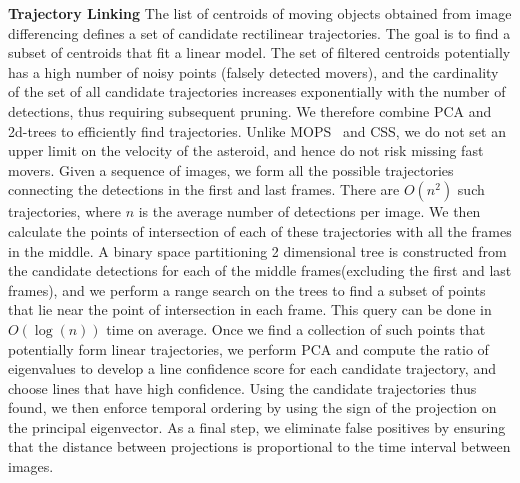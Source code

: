 \documentclass{article}
\begin{document}
{\bf Trajectory Linking}
The list of centroids of moving objects obtained from image differencing defines a set of candidate rectilinear trajectories.  The goal is to find a subset of centroids that fit a linear model.  The set of filtered centroids potentially has a high number of noisy points (falsely detected movers), and the cardinality of the set of all candidate trajectories increases exponentially with the number of detections, thus requiring subsequent pruning. We therefore combine PCA and 2d-trees to efficiently find trajectories. Unlike MOPS~\cite{denneau2013pan} and CSS\cite{css2014}, we do not set an upper limit on the velocity of the asteroid, and hence do not risk missing fast movers. Given a sequence of images, we form all the possible trajectories connecting the detections in the first and last frames. There are $O(n^2)$ such trajectories, where $n$ is the average number of detections per image. We then calculate the points of intersection of each of these trajectories with all the frames in the middle. A binary space partitioning 2 dimensional tree is constructed from the candidate detections for each of the middle frames(excluding the first and last frames), and we perform a range search on the trees to find a subset of points that lie near the point of intersection in each frame. This query can be done in $O(\log(n))$ time on average. Once we find a collection of such points that potentially form linear trajectories, we perform PCA and compute the ratio of eigenvalues to develop a line confidence score for each candidate trajectory, and choose lines that have high confidence. Using the candidate trajectories thus found, we then enforce temporal ordering by using the sign of the projection on the principal eigenvector.  As a final step, we eliminate false positives by ensuring that the distance between projections is proportional to the time interval between images. 
\end{document}
